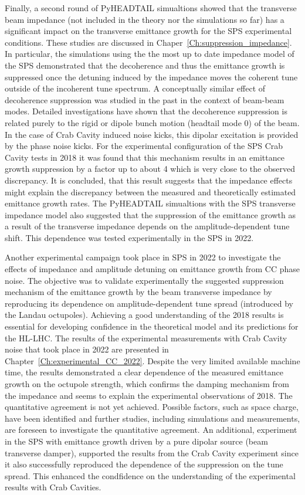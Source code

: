 Finally, a second round of PyHEADTAIL simualtions showed that the transverse beam impedance (not included in the theory nor the simulations so far) has a significant impact on the transverse emittance growth for the SPS experimental conditions. These studies are discussed in Chaper~\ref{Ch:suppression_impedance}. In particular, the simulations using the the most up to date impedance model of the SPS demonstrated that the decoherence and thus the emittance growth is suppressed once the detuning induced by the impedance moves the coherent tune outside of the incoherent tune spectrum. A conceptually similar effect of decoherence suppression was studied in the past in the context of beam-beam modes. Detailed investigations have shown that the decoherence suppression is related purely to the rigid or dipole bunch motion (headtail mode 0) of the beam. In the case of Crab Cavity induced noise kicks, this dipolar excitation is provided by the phase noise kicks. For the experimental configuration of the SPS Crab Cavity tests in 2018 it was found that this mechanism results in an emittance growth suppression by a factor up to about 4 which is very close to the observed discrepancy. It is concluded, that this result suggests that the impedance effects might explain the discrepancy between the measured and theoretically estimated emittance growth rates. The PyHEADTAIL simualtions with the SPS transverse impedance model also suggested that the suppression of the emittance growth as a result of the transverse impedance depends on the amplitude-dependent tune shift. This dependence was tested experimentally in the SPS in 2022.

Another experimental campaign took place in SPS in 2022 to investigate the effects of impedance and amplitude detuning on emittance growth from CC phase noise. The objective was to validate experimentally the suggested suppression mechanism of the emittance growth by the beam transverse impedance by reproducing its dependence on amplitude-dependent tune spread (introduced by the Landau octupoles). Achieving a good understanding of the 2018 results is essential for developing confidence in the theoretical model and its predictions for the HL-LHC. The results of the experimental measurements with Crab Cavity noise that took place in 2022 are presented in Chapter~\ref{Ch:experimental_CC_2022}. Despite the very limited available machine time, the results demonstrated a clear dependence of the measured emittance growth on the octupole strength, which confirms the damping mechanism from the impedance and seems to explain the experimental observations of 2018. The quantitative agreement is not yet achieved. Possible factors, such as space charge, have been identified and further studies, including simulations and measurements, are foreseen to investigate the quantitative agreement. An additional, experiment in the SPS with emittance growth driven by a pure dipolar source (beam transverse damper), supported the results from the Crab Cavity experiment since it also successfully reproduced the dependence of the suppression on the tune spread. This enhanced the condfidence on the understanding of the experimental results with Crab Cavities.

